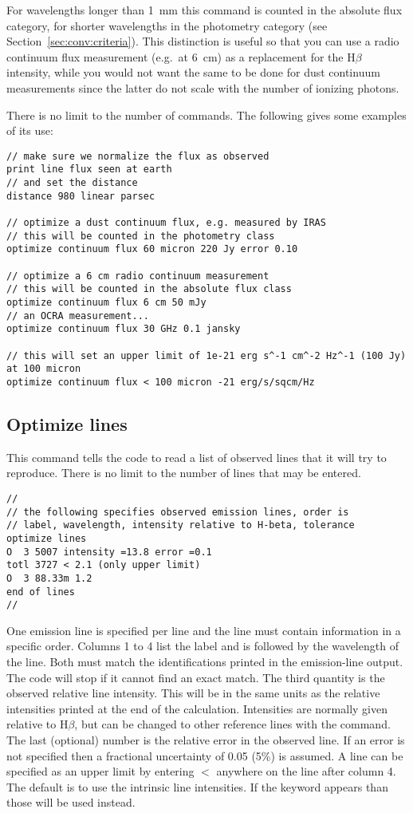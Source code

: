 For wavelengths longer than 1~mm this command is counted in the
absolute flux category, for shorter wavelengths in the photometry category (see
Section~\ref{sec:conv:criteria}). This distinction is useful so that you can
use a radio continuum flux measurement (e.g.\ at 6~cm) as a replacement for
the H$\beta$ intensity, while you would not want the same to be done for dust
continuum measurements since the latter do not scale with the number of
ionizing photons.

There is no limit to the number of 
commands. The following gives some examples of its use:
\begin{verbatim}
// make sure we normalize the flux as observed
print line flux seen at earth
// and set the distance
distance 980 linear parsec

// optimize a dust continuum flux, e.g. measured by IRAS
// this will be counted in the photometry class
optimize continuum flux 60 micron 220 Jy error 0.10

// optimize a 6 cm radio continuum measurement
// this will be counted in the absolute flux class
optimize continuum flux 6 cm 50 mJy
// an OCRA measurement...
optimize continuum flux 30 GHz 0.1 jansky

// this will set an upper limit of 1e-21 erg s^-1 cm^-2 Hz^-1 (100 Jy) at 100 micron
optimize continuum flux < 100 micron -21 erg/s/sqcm/Hz
\end{verbatim}

\subsection{Optimize lines}

This command tells the code to read a list of observed lines that it
will try to reproduce.
There is no limit to the number of lines that may be entered.
\begin{verbatim}
//
// the following specifies observed emission lines, order is
// label, wavelength, intensity relative to H-beta, tolerance
optimize lines
O  3 5007 intensity =13.8 error =0.1
totl 3727 < 2.1 (only upper limit)
O  3 88.33m 1.2
end of lines
//
\end{verbatim}

One emission line is specified per line and the line must contain
information in a specific order.
Columns 1 to 4 list the label and is
followed by the wavelength of the line.
Both must match the identifications
printed in the emission-line output.
The code will stop if it cannot find
an exact match.
The third quantity is the observed relative line intensity.
This will be in the same units as the relative intensities printed at the
end of the calculation.
Intensities are normally given relative to H$\beta$,
but can be changed to other reference lines with the
 command.
The last (optional) number is the
relative error in the observed line.
If an error is not specified then
a fractional uncertainty of 0.05 (5\%) is assumed.
A line can be specified
as an upper limit by entering $<$ anywhere on the line after column 4.
The default is to use the intrinsic line intensities.
If the keyword  appears than
those will be used instead.

